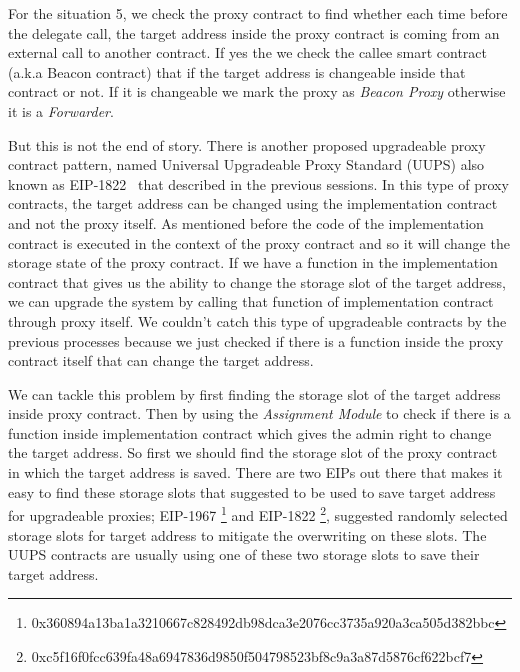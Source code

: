 For the situation 5, we check the proxy contract to find whether each time before the delegate call, the target address inside the proxy contract is coming from an external call to another contract. If yes the we check the callee smart contract (a.k.a Beacon contract) that if the target address is changeable inside that contract or not. If it is changeable we mark the proxy as \textit{Beacon Proxy} otherwise it is a \textit{Forwarder}. 

But this is not the end of story. There is another proposed upgradeable proxy contract pattern, named Universal Upgradeable Proxy Standard (UUPS) also known as EIP-1822~\cite{uupsEIP} that described in the previous sessions. In this type of proxy contracts, the target address can be changed using the implementation contract and not the proxy itself. As mentioned before the code of the implementation contract is executed in the context of the proxy contract and so it will change the storage state of the proxy contract. If we have a function in the implementation contract that gives us the ability to change the storage slot of the target address, we can upgrade the system by calling that function of implementation contract through proxy itself. We couldn't catch this type of upgradeable contracts by the previous processes because we just checked if there is a function inside the proxy contract itself that can change the target address.

We can tackle this problem by first finding the storage slot of the target address inside proxy contract. Then by using the \textit{Assignment Module} to check if there is a function inside implementation contract which gives the admin right to change the target address. So first we should find the storage slot of the proxy contract in which the target address is saved. There are two EIPs out there that makes it easy to find these storage slots that suggested to be used to save target address for upgradeable proxies; EIP-1967 \footnote{0x360894a13ba1a3210667c828492db98dca3e2076cc3735a920a3ca505d382bbc} and EIP-1822 \footnote{0xc5f16f0fcc639fa48a6947836d9850f504798523bf8c9a3a87d5876cf622bcf7}, suggested randomly selected storage slots for target address to mitigate the overwriting on these slots. The UUPS contracts are usually using one of these two storage slots to save their target address.


